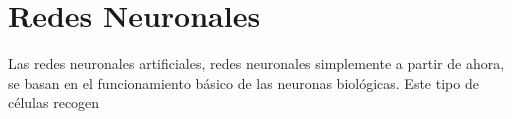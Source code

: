 \section{Redes Neuronales}

\noindent Las redes neuronales artificiales, redes neuronales simplemente a partir de ahora, se basan en el funcionamiento básico de las neuronas biológicas. Este tipo de células recogen 